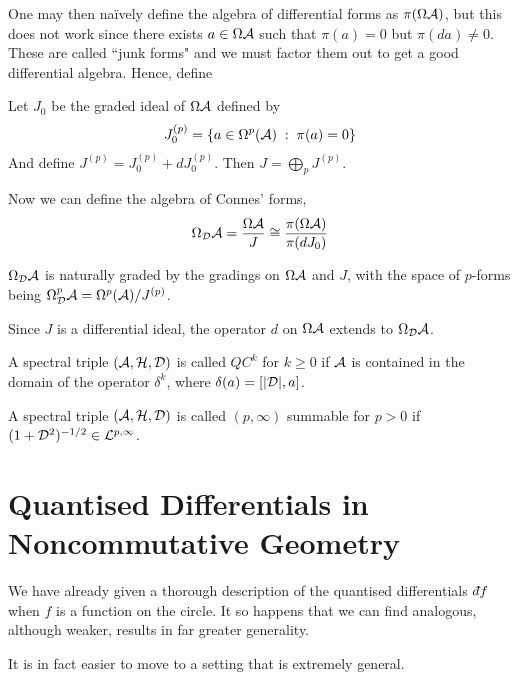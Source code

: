 One may then na\"ively define the algebra of differential forms as $\pi(\Omega \mathcal{A})$,
but this does not work since there exists $a \in \Omega \mathcal{A}$ such that $\pi(a) = 0$
but $\pi(da) \neq 0$. These are called ``junk forms" and we must factor them out to get
a good differential algebra. Hence, define
\begin{definition}
    Let $J_0$ be the graded ideal of $\Omega \mathcal{A}$ defined by 
    \begin{equation*}
        J_0^{(p)} = \{a \in \Omega^p(\mathcal{A}) \;:\; \pi(a) = 0\}
    \end{equation*}
    And define $J^{(p)} = J_0^{(p)} + dJ_0^{(p)}$. Then $J = \bigoplus_p J^{(p)}$.


Now we can define the algebra of Connes' forms,
\begin{equation*}
    \Omega_{\mathcal{D}}\mathcal{A} = \frac{\Omega \mathcal{A}}{J} \cong \frac{\pi(\Omega \mathcal{A})}{\pi(dJ_0)}
\end{equation*}

$\Omega_{\mathcal{D}} \mathcal{A}$ is naturally graded by the gradings on $\Omega \mathcal{A}$ and $J$, with the 
space of $p$-forms being $\Omega^p_{\mathcal{D}} \mathcal{A} = \Omega^p(\mathcal{A})/J^{(p)}$.

Since $J$ is a differential ideal, the operator $d$ on $\Omega \mathcal{A}$
extends to $\Omega_{\mathcal{D}} \mathcal{A}$.  
\end{definition}

\begin{definition}
    A spectral triple $(\mathcal{A},\mathcal{H},\mathcal{D})$ is called $QC^k$ for $k \geq 0$
    if $\mathcal{A}$ is contained in the domain of the operator $\delta^k$, where $\delta(a) = [|\mathcal{D}|,a]$.
\end{definition}

\begin{definition}[Summability]
    A spectral triple $(\mathcal{A},\mathcal{H},\mathcal{D})$ is called $(p,\infty)$ summable
    for $p > 0$ if $(1+\mathcal{D}^2)^{-1/2} \in \mathcal{L}^{p,\infty}$.
\end{definition}

        
\section{Quantised Differentials in Noncommutative Geometry}
We have already given a thorough description of the quantised differentials $\qd f$
when $f$ is a function on the circle. It so happens that we can find
analogous, although weaker, results in far greater generality.

It is in fact easier to move to a setting that is extremely general.


